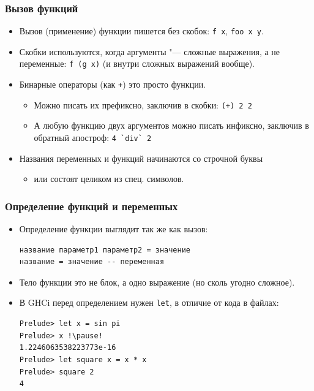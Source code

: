 \documentclass[10pt]{beamer}
\begin{document}
\begin{frame}[fragile]
\frametitle{Вызов функций}
\begin{itemize}
    \item Вызов (применение) функции пишется без скобок: \lstinline|f x|, \lstinline|foo x y|. 
    \item Скобки используются, когда аргументы "--- сложные выражения, а не переменные: \lstinline|f (g x)| (и внутри сложных выражений вообще).
    \item Бинарные операторы (как \lstinline|+|) это просто функции.
    \begin{itemize}
        \item Можно писать их префиксно, заключив в скобки: \lstinline[breaklines=false]|(+) 2 2|
        \item А любую функцию двух аргументов можно писать инфиксно, заключив в обратный апостроф: \lstinline|4 `div` 2|
    \end{itemize}
    \item Названия переменных и функций начинаются со строчной буквы
        \begin{itemize}
            \item или состоят целиком из спец. символов.
        \end{itemize}
\end{itemize}
\end{frame}

\begin{frame}[fragile]
\frametitle{Определение функций и переменных}
\begin{itemize}
    \item Определение функции выглядит так же как вызов:
\begin{lstlisting}[breaklines]
название параметр1 параметр2 = значение
название = значение -- переменная
\end{lstlisting}
    \item Тело функции это не блок, а одно выражение (но сколь угодно сложное).
    \item В GHCi перед определением нужен \lstinline|let|, в отличие от кода в файлах: 
\begin{lstlisting}
Prelude> let x = sin pi
Prelude> x !\pause!
1.2246063538223773e-16
Prelude> let square x = x * x
Prelude> square 2
4
\end{lstlisting}
\end{itemize}
\end{frame}
\end{document}

